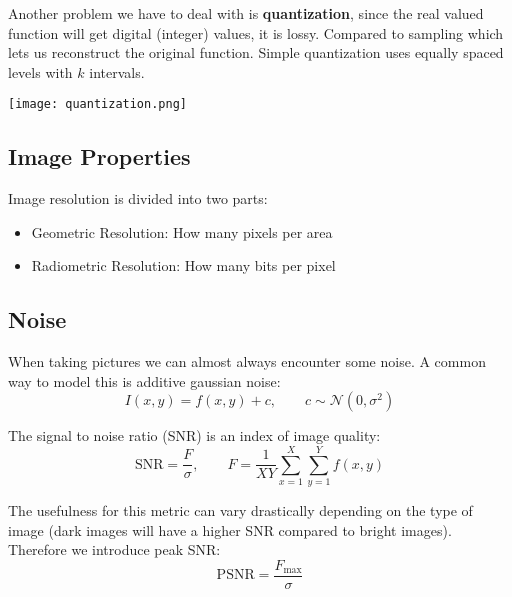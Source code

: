 Another problem we have to deal with is \textbf{quantization}, since the real valued function will get digital (integer) values, it is lossy. Compared to sampling which lets us reconstruct the original function. Simple quantization uses equally spaced levels with $k$ intervals.

\begin{center}
	\texttt{[image: quantization.png]}
\end{center}

\subsection{Image Properties}

Image resolution is divided into two parts:
\begin{itemize}
	\item Geometric Resolution: How many pixels per area
	\item Radiometric Resolution: How many bits per pixel
\end{itemize}

\subsection{Noise}

When taking pictures we can almost always encounter some noise. A common way to model this is additive gaussian noise:
$$I(x,y) = f(x,y) + c, \qquad c \sim \mathcal N(0, \sigma^2)$$

The signal to noise ratio (SNR) is an index of image quality:
$$\text{SNR} = \frac{F}{\sigma}, \qquad F = \frac{1}{XY} \sum_{x=1}^{X}\sum_{y=1}^{Y} f(x,y)$$

The usefulness for this metric can vary drastically depending on the type of image (dark images will have a higher SNR compared to bright images). Therefore we introduce peak SNR:
$$\text{PSNR} = \frac{F_\text{max}}{\sigma}$$
